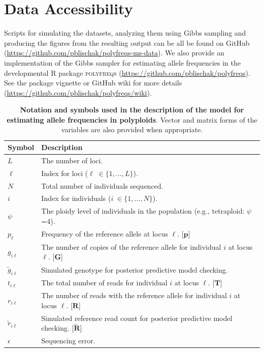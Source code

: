 \documentclass[11pt,english,letterpaper,oneside]{article}
\begin{document}
\section*{Data Accessibility}            %

Scripts for simulating the datasets, analyzing them using Gibbs sampling and producing the figures from the resulting output can be all be found on GitHub (\url{https://github.com/pblischak/polyfreqs-ms-data}). We also provide an implementation of the Gibbs sampler for estimating allele frequencies in the developmental R package \textsc{polyfreqs} (\url{https://github.com/pblischak/polyfreqs}). See the package vignette or GitHub wiki for more details (\url{https://github.com/pblischak/polyfreqs/wiki}).
\vfill


\begin{table}[b]
\centering
{}
\caption{\textbf{Notation and symbols used in the description of the model for estimating allele frequencies in polyploids}. Vector and matrix forms of the variables are also provided when appropriate. }
\vspace{0.25in}
\bgroup
\def\arraystretch{1.45}
\begin{tabular}[l]{l | l}
\hline
\textbf{Symbol} & \textbf{Description}\\ \hline
$L$ & The number of loci. \\
$\ell$ & Index for loci ($\ell\; \in \{1,\ldots,L\}$). \\
$N$ & Total number of individuals sequenced. \\
$i$ & Index for individuals ($i\; \in \{1,\ldots,N\}$). \\
$\psi$ & The ploidy level of individuals in the population (e.g., tetraploid: $\psi$=4). \\
$p_{\ell}$ & Frequency of the reference allele at locus $\ell$. [$\bm{p}$] \\
$g_{i \ell}$ & The number of copies of the reference allele for individual $i$ at locus $\ell$. [$\bm{G}$] \\
$\tilde{g}_{i \ell}$ & Simulated genotype for posterior predictive model checking. \\
$t_{i \ell}$ & The total number of reads for individual $i$ at locus $\ell$. [$\bm{T}$] \\
$r_{i \ell}$ & The number of reads with the reference allele for individual $i$ at locus $\ell$. [$\bm{R}$] \\
$\tilde{r}_{i \ell}$ & Simulated reference read count for posterior predictive model checking. [$\tilde{\bm{R}}$] \\
$\epsilon$ & Sequencing error. \\
\hline
\end{tabular}
\egroup
\label{table1}
\vspace{0.25in}
\end{table}
\vfill
\end{document}
